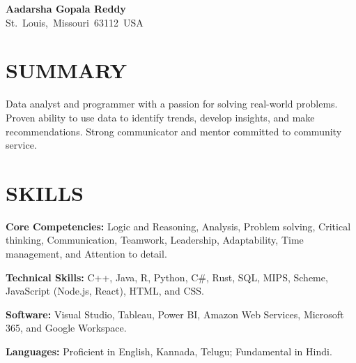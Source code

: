 \documentclass[10pt, letterpaper]{article}
\begin{document}
\begin{header}
    \fontsize{20pt}{20pt}\selectfont \textbf{Aadarsha Gopala Reddy}\\
    \normalsize
    \vspace{\headerSpacing}
    \mbox{St. Louis, Missouri 63112 USA}%
    \kern {}%
    \AND%
    \kern {}%
    \mbox{}%
    \kern {}%
    \AND%
    \kern {}%
    \mbox{}%
    \kern {}%
    \AND%
    \kern {}%
    \mbox{}%
\end{header}

\section{SUMMARY}

\begin{onecolentry}
    Data analyst and programmer with a passion for solving real-world problems. Proven ability to use data to identify trends, develop insights, and make recommendations. Strong communicator and mentor committed to community service.
\end{onecolentry}

\section{SKILLS}

\begin{onecolentry}
    \textbf{Core Competencies:} Logic and Reasoning, Analysis, Problem solving, Critical thinking, Communication, Teamwork, Leadership, Adaptability, Time management, and Attention to detail.
\end{onecolentry}
\vspace{\highlightSpacing}
\begin{onecolentry}
    \textbf{Technical Skills:} C++, Java, R, Python, C\#, Rust, SQL, MIPS, Scheme, JavaScript (Node.js, React), HTML, and CSS.
\end{onecolentry}
\vspace{\highlightSpacing}
\begin{onecolentry}
    \textbf{Software:} Visual Studio, Tableau, Power BI, Amazon Web Services, Microsoft 365, and Google Workspace.
\end{onecolentry}
\vspace{\highlightSpacing}
\begin{onecolentry}
    \textbf{Languages:} Proficient in English, Kannada, Telugu; Fundamental in Hindi.
\end{onecolentry}
\end{document}
